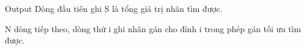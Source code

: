 Output
Dòng đầu tiên ghi S là tổng giá trị nhãn tìm được.


N dòng tiếp theo, dòng thứ i ghi nhãn gán cho đỉnh i trong phép gán tối ưu tìm được.